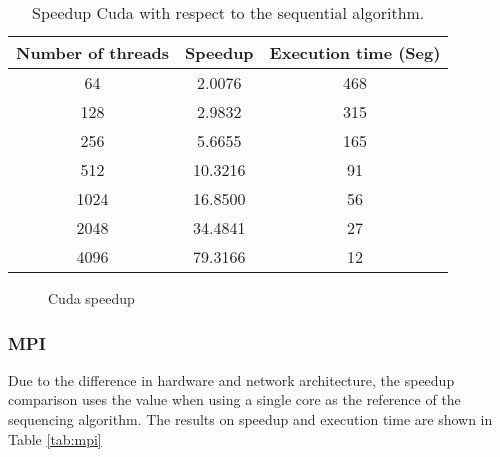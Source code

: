 \documentclass{IEEEtran}
\begin{document}

\begin{table}[h]
  \centering
  \begin{tabular}{|c|c|c|}
    \hline
    \textbf{Number of threads} & \textbf{Speedup} & \textbf{Execution time (Seg)} \\ \hline
    64                         & 2.0076           & 468                           \\
    128                        & 2.9832           & 315                           \\
    256                        & 5.6655           & 165                           \\
    512                        & 10.3216          & 91                            \\
    1024                       & 16.8500          & 56                            \\
    2048                       & 34.4841          & 27                            \\
    4096                       & 79.3166          & 12                            \\ \hline
  \end{tabular}
  \caption{Speedup Cuda with respect to the sequential algorithm.}
  \label{tab:cuda}
\end{table}


\begin{figure}[ht]
  \centering
  
  \caption{Cuda speedup}
  \label{fig:cuda speed}
\end{figure}

\subsubsection{MPI}

Due to the difference in hardware and network architecture, the speedup comparison uses the value when using a single core as the reference of the sequencing algorithm. The results on speedup and execution time are shown in Table \ref{tab:mpi}
\end{document}
